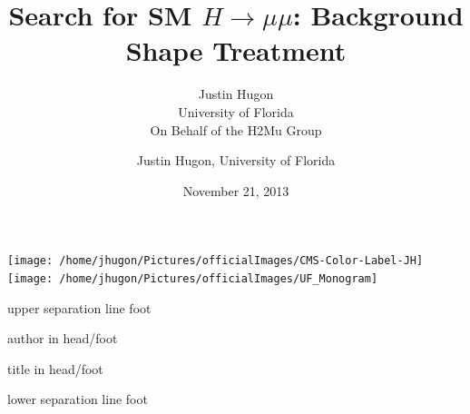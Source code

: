 \documentclass{beamer}
\title{Search for SM $H \rightarrow \mu \mu$: Background Shape Treatment}
\date{November 21, 2013}
\author{Justin Hugon \\ University of Florida \vspace{0.5em} \\ On Behalf of the H2Mu Group}
\begin{document}
\begin{frame}
  \maketitle
\vspace{-1em}
  \texttt{[image: /home/jhugon/Pictures/officialImages/CMS-Color-Label-JH]}
  \hfill
  \texttt{[image: /home/jhugon/Pictures/officialImages/UF\_Monogram]}
\end{frame}

\makeatletter
{}
{
    \begin{beamercolorbox}[colsep=1.5pt]{upper separation line foot}
    \end{beamercolorbox}
    \begin{beamercolorbox}[ht=2.5ex,dp=1.125ex,%
      leftskip=.3cm,rightskip=.3cm plus1fil]{author in head/foot}%
      \hfill%
      {\insertshortinstitute}%
    \end{beamercolorbox}%
    \begin{beamercolorbox}[ht=2.5ex,dp=1.125ex,%
      leftskip=.3cm,rightskip=.3cm plus1fil]{title in head/foot}%
      {\insertshorttitle \hfill \insertframenumber}%
    \end{beamercolorbox}%
    \begin{beamercolorbox}[colsep=1.5pt]{lower separation line foot}
    \end{beamercolorbox}
}
\makeatother

\author{Justin Hugon, University of Florida}

\end{document}
